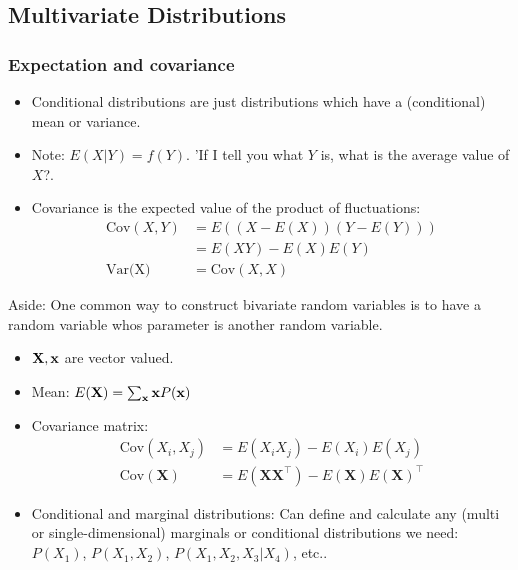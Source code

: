 \subsection{Multivariate Distributions}
\subsubsection{Expectation and covariance}
\begin{itemize}
\item Conditional distributions are just distributions which have a (conditional) mean or variance. 
\item Note: $E(X|Y)= f(Y)$. 'If I tell you what $Y$ is, what is the average value of $X$?.
\item Covariance is the expected value of the product of fluctuations: 
\begin{align}
 \mbox{Cov}(X,Y)&= E\left((X-E(X) )(Y-E(Y) )\right)\\
 &= E(XY)- E(X)E(Y)\\
 \mbox{Var(X)}&= \mbox{Cov}(X,X)
\end{align}
 \end{itemize}
Aside: One common way to construct bivariate random variables is to have a random variable whos parameter is another random variable. 

\begin{itemize} 
\item $\mathbf{X},{\mathbf{x}}$ are vector valued.
\item Mean: $E(\mathbf{X})= \sum_{{\mathbf{x}}} {\mathbf{x}} P({\mathbf{x}})$
\item Covariance matrix: 
\begin{align}
\mbox{Cov}(X_i, X_j)&= E(X_iX_j)-E(X_i) E(X_j)\\
\mbox{Cov}(\mathbf{X})&= E(\mathbf{X}\mathbf{X}^\top)-E(\mathbf{X}) 
E(\mathbf{X})^\top 
 \end{align}
\item Conditional and marginal distributions: Can define and calculate any (multi or single-dimensional) marginals or conditional distributions we need:  $P(X_1)$, $P(X_1, X_2)$, $P(X_1, X_2, X_3 |X_4)$, etc..
\end{itemize}

